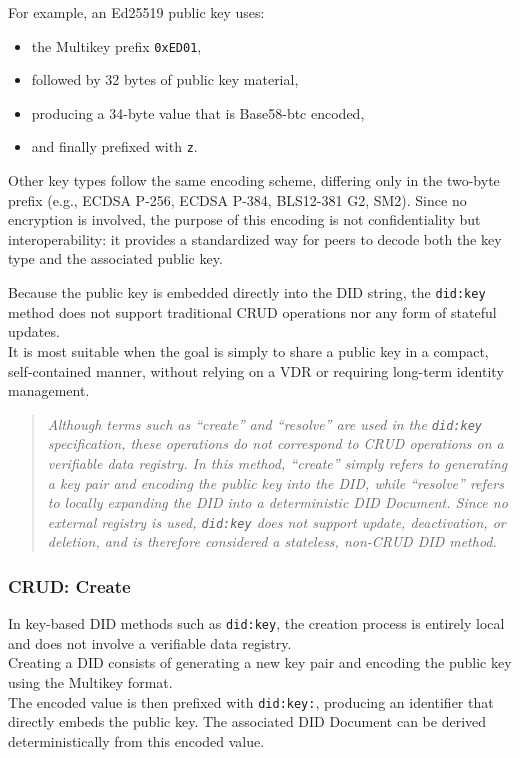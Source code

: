 \medskip

\noindent
For example, an Ed25519 public key uses:
\begin{itemize}
    \item the Multikey prefix \texttt{0xED01},
    \item followed by 32 bytes of public key material,
    \item producing a 34-byte value that is Base58-btc encoded,
    \item and finally prefixed with \texttt{z}.
\end{itemize}

\noindent
Other key types follow the same encoding scheme, differing only in the two-byte prefix
(e.g., ECDSA P-256, ECDSA P-384, BLS12-381 G2, SM2).  
Since no encryption is involved, the purpose of this encoding is not confidentiality
but interoperability: it provides a standardized way for peers to decode both the
key type and the associated public key.

\medskip

\noindent
Because the public key is embedded directly into the DID string, the
\texttt{did:key} method does not support traditional CRUD operations nor any form of
stateful updates.\\  
It is most suitable when the goal is simply to share a public key in a compact,
self-contained manner, without relying on a VDR or requiring long-term identity management.
\medskip

\begin{quotation}
  \noindent
  \textit{
  Although terms such as “create” and “resolve” are used in the \texttt{did:key} 
  specification, these operations do not correspond to CRUD operations on a 
  verifiable data registry. In this method, “create” simply refers to generating 
  a key pair and encoding the public key into the DID, while “resolve” refers to 
  locally expanding the DID into a deterministic DID Document. 
  Since no external registry is used, \texttt{did:key} does not support update, 
  deactivation, or deletion, and is therefore considered a stateless, non-CRUD 
  DID method.
  }
\end{quotation}

\subsubsection*{CRUD: Create}
In key-based DID methods such as \texttt{did:key}, the creation process is entirely local and does not involve a verifiable data registry.\\ Creating a DID consists of generating a new key pair and encoding the 
public key using the Multikey format. \\
The encoded value is then prefixed with \texttt{did:key:}, producing an identifier that directly embeds the public key. The associated DID Document can be derived deterministically from this encoded value.

